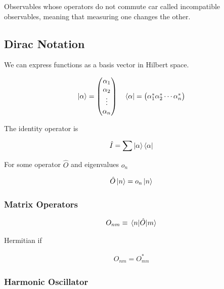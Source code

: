 \documentclass[10pt]{amsart}
\begin{document}
\begin{multicols}{2}
Observables whose operators do not commute car called incompatible observables,
meaning that measuring one changes the other.

\subsection{Dirac Notation}%
\label{sub:dirac_notation}

We can express functions as a basis vector in Hilbert space.

\begin{align*}
  \ket{\alpha}=\begin{pmatrix}
    \alpha_1\\
    \alpha_2\\
    \vdots \\
    \alpha_n
  \end{pmatrix}\quad
  \bra{\alpha}=\begin{pmatrix}
    \alpha_1^*  \alpha_2^*  \cdots  \alpha_n^*
  \end{pmatrix}
\end{align*}

The identity operator is

\begin{align*}
  \hat{I}=\sum\ket{\alpha}\bra{\alpha}
\end{align*}

For some operator $\hat{O}$ and eigenvalues $o_n$

\begin{align*}
  \hat{O}\ket{n}=o_n\ket{n}
\end{align*}

\subsubsection{Matrix Operators}%
\label{ssub:matrix_operators}

\begin{align*}
  O_{nm}\equiv\matrixel{n}{\hat{O}}{m}
\end{align*}

Hermitian if

\begin{align*}
  O_{nm}=O_{mn}^*
\end{align*}

\subsubsection{Harmonic Oscillator}%
\label{ssub:harmonic_oscillator}


\end{multicols}
\end{document}
